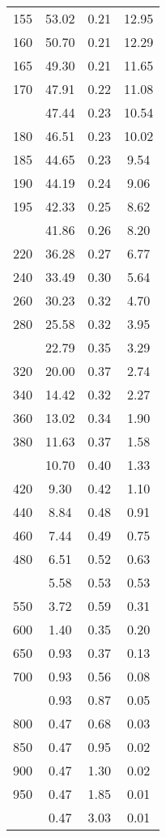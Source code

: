 \begin{table}[ht]
\begin{tabular}{lccc}
  155 & 53.02 & 0.21 & 12.95 \\ 
  160 & 50.70 & 0.21 & 12.29 \\ 
  165 & 49.30 & 0.21 & 11.65 \\ 
  170 & 47.91 & 0.22 & 11.08 \\ 
   \addlinespace
175 & 47.44 & 0.23 & 10.54 \\ 
  180 & 46.51 & 0.23 & 10.02 \\ 
  185 & 44.65 & 0.23 & 9.54 \\ 
  190 & 44.19 & 0.24 & 9.06 \\ 
  195 & 42.33 & 0.25 & 8.62 \\ 
   \addlinespace
200 & 41.86 & 0.26 & 8.20 \\ 
  220 & 36.28 & 0.27 & 6.77 \\ 
  240 & 33.49 & 0.30 & 5.64 \\ 
  260 & 30.23 & 0.32 & 4.70 \\ 
  280 & 25.58 & 0.32 & 3.95 \\ 
   \addlinespace
300 & 22.79 & 0.35 & 3.29 \\ 
  320 & 20.00 & 0.37 & 2.74 \\ 
  340 & 14.42 & 0.32 & 2.27 \\ 
  360 & 13.02 & 0.34 & 1.90 \\ 
  380 & 11.63 & 0.37 & 1.58 \\ 
   \addlinespace
400 & 10.70 & 0.40 & 1.33 \\ 
  420 & 9.30 & 0.42 & 1.10 \\ 
  440 & 8.84 & 0.48 & 0.91 \\ 
  460 & 7.44 & 0.49 & 0.75 \\ 
  480 & 6.51 & 0.52 & 0.63 \\ 
   \addlinespace
500 & 5.58 & 0.53 & 0.53 \\ 
  550 & 3.72 & 0.59 & 0.31 \\ 
  600 & 1.40 & 0.35 & 0.20 \\ 
  650 & 0.93 & 0.37 & 0.13 \\ 
  700 & 0.93 & 0.56 & 0.08 \\ 
   \addlinespace
750 & 0.93 & 0.87 & 0.05 \\ 
  800 & 0.47 & 0.68 & 0.03 \\ 
  850 & 0.47 & 0.95 & 0.02 \\ 
  900 & 0.47 & 1.30 & 0.02 \\ 
  950 & 0.47 & 1.85 & 0.01 \\ 
   \addlinespace
1000 & 0.47 & 3.03 & 0.01 \\ 
   \bottomrule
\end{tabular}
\end{table}
